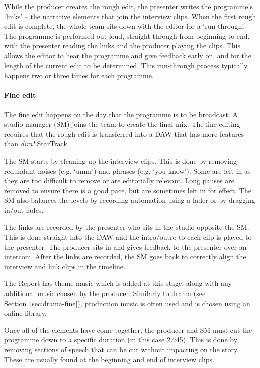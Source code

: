 While the producer creates the rough edit, the presenter writes the programme's `links' -- the narrative elements that
join the interview clips. When the first rough edit is complete, the whole team sits down with the editor for a
`run-through'. The programme is performed out loud, straight-through from beginning to end, with the presenter reading
the links and the producer playing the clips. This allows the editor to hear the programme and give feedback early on,
and for the length of the current edit to be determined. This run-through process typically happens two or three times
for each programme.

\paragraph{Fine edit}
The fine edit happens on the day that the programme is to be broadcast. A studio manager (SM) joins the team to create
the final mix. The fine editing requires that the rough edit is transferred into a DAW that has more features than
\textit{dira!} StarTrack.

The SM starts by cleaning up the interview clips. This is done by removing redundant noises (e.g. `umm') and phrases
(e.g. `you know'). Some are left in as they are too difficult to remove or are editorially relevant. Long pauses are
removed to ensure there is a good pace, but are sometimes left in for effect.  The SM also balances the levels by
recording automation using a fader or by dragging in/out fades. 

The links are recorded by the presenter who sits in the studio opposite the SM.  This is done straight into the DAW and
the intro/outro to each clip is played to the presenter. The producer sits in and gives feedback to the presenter over
an intercom. After the links are recorded, the SM goes back to correctly align the interview and link clips in the
timeline.

The Report has theme music which is added at this stage, along with any additional music chosen by the producer.
Similarly to drama (see Section~\ref{sec:drama-fine}), production music is often used and is chosen using an online
library.

Once all of the elements have come together, the producer and SM must cut the programme down to a specific duration (in
this case 27:45). This is done by removing sections of speech that can be cut without impacting on the story.  These
are usually found at the beginning and end of interview clips.

